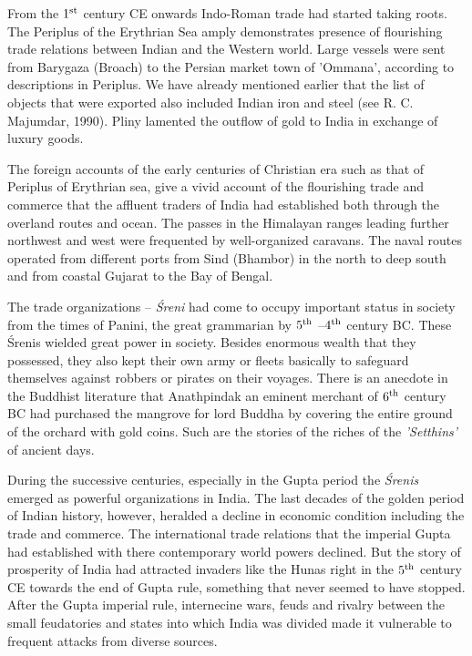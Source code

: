 From the $1^{\rm st}$ century CE onwards Indo-Roman trade had started taking roots. The Periplus of the Erythrian Sea amply demonstrates presence of flourishing trade relations between Indian and the Western world. Large vessels were sent from Barygaza (Broach) to the Persian market town of 'Ommana', according to descriptions in Periplus. We have already mentioned earlier that the list of objects that were exported also included Indian iron and steel (see R. C. Majumdar, 1990). Pliny lamented the outflow of gold to India in exchange of luxury goods.

The foreign accounts of the early centuries of Christian era such as that of Periplus of Erythrian sea, give a vivid account of the flourishing trade and commerce that the affluent traders of India had established both through the overland routes and ocean. The passes in the Himalayan ranges leading further northwest and west were frequented by well-organized caravans. The naval routes operated from different ports from Sind (Bhambor) in the north to deep south and from coastal Gujarat to the Bay of Bengal.

The trade organizations – {\it Śreni} had come to occupy important status in society from the times of Panini, the great grammarian by $5^{\rm th}$ –$4^{\rm th}$ century BC. These Śrenis wielded great power in society. Besides enormous wealth that they possessed, they also kept their own army or fleets basically to safeguard themselves against robbers or pirates on their voyages. There is an anecdote in the Buddhist literature that Anathpindak an eminent merchant of $6^{\rm th}$ century BC had purchased the mangrove for lord Buddha by covering the entire ground of the orchard with gold coins. Such are the stories of the riches of the {\it 'Setthins'} of ancient days.

During the successive centuries, especially in the Gupta period the {\it Śrenis} emerged as powerful organizations in India. The last decades of the golden period of Indian history, however, heralded a decline in economic condition including the trade and commerce. The international trade relations that the imperial Gupta had established with there contemporary world powers declined. But the story of prosperity of India had attracted invaders like the Hunas right in the $5^{\rm th}$ century CE towards the end of Gupta rule, something that never seemed to have stopped. After the Gupta imperial rule, internecine wars, feuds and rivalry between the small feudatories and states into which India was divided made it vulnerable to frequent attacks from diverse sources. 

